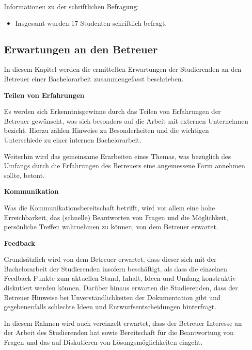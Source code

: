 \documentclass[bibliography=totoc,listof=totoc,BCOR=5mm,DIV=12,oneside]{scrbook}
\begin{document}
\label{sub:studentenchriftlichErgebnisse}
\par \bigskip Informationen zu der schriftlichen Befragung:
\begin{itemize}
\item Insgesamt wurden 17 Studenten schriftlich befragt.
\end{itemize}

\subsection{Erwartungen an den Betreuer}
\par In diesem Kapitel werden die ermittelten Erwartungen der Studierenden an den Betreuer einer Bachelorarbeit zusammengefasst beschrieben. 

\par \bigskip \textbf{Teilen von Erfahrungen}
\par Es werden sich Erkenntnisgewinne durch das Teilen von Erfahrungen der Betreuer gewünscht, was sich besonders auf die Arbeit mit externen Unternehmen bezieht. Hierzu zählen Hinweise zu Besonderheiten und die wichtigen Unterschiede zu einer internen Bachelorarbeit. 
\par Weiterhin wird das gemeinsame Erarbeiten eines Themas, was bezüglich des Umfangs durch die Erfahrungen des Betreuers eine angemessene Form annehmen sollte, betont.

\par \bigskip \textbf{Kommunikation}
\par Was die Kommunikationsbereitschaft betrifft, wird vor allem eine hohe Erreichbarkeit, das (schnelle) Beantworten von Fragen und die Möglichkeit, persönliche Treffen wahrnehmen zu können, von dem Betreuer erwartet.

\par \bigskip \textbf{Feedback}
\par Grundsätzlich wird von dem Betreuer erwartet, dass dieser sich mit der Bachelorarbeit der Studierenden insofern beschäftigt, als dass die einzelnen Feedback-Punkte zum aktuellen Stand, Inhalt, Ideen und Umfang konstruktiv diskutiert werden können. Darüber hinaus erwarten die Studierenden, dass der Betreuer Hinweise bei Unverständlichkeiten der Dokumentation gibt und gegebenenfalls schlechte Ideen und Entwurfsentscheidungen hinterfragt.
\par In diesem Rahmen wird auch vereinzelt erwartet, dass der Betreuer Interesse an der Arbeit des Studierenden hat sowie Bereitschaft für die Beantwortung von Fragen und das auf Diskutieren von Lösungsmöglichkeiten eingeht.
\end{document}

